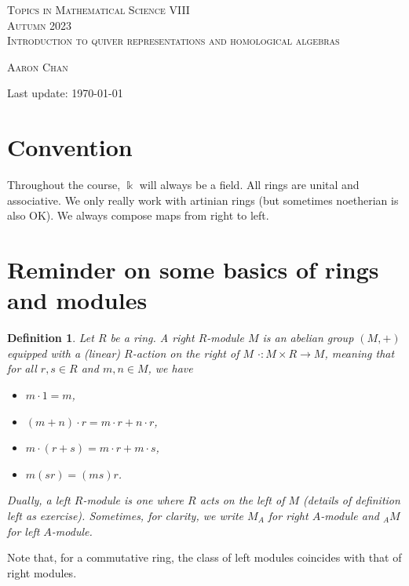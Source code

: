 \documentclass[11pt,a4paper]{article}
\numberwithin{equation}{section}
\theoremstyle{all}
\newtheorem{definition}[theorem]{Definition}
\theoremstyle{remark}
\newcommand{\defn}[1]{\textsl{\color{darkblue} #1}}
\begin{document}
\begin{center}
\textsc{{\LARGE Topics in Mathematical Science VIII}\\
Autumn 2023}\\
\textsc{\Large Introduction to quiver representations and homological algebras}

\textsc{Aaron Chan}
\end{center}

Last update: \today



\section*{Convention}
 
Throughout the course, $\Bbbk$ will always be a field.
All rings are unital and associative.
We only really work with artinian rings (but sometimes noetherian is also OK).
We always compose maps from right to left.

\section{Reminder on some basics of rings and modules}

\begin{definition}
Let $R$ be a ring.
A \defn{right $R$-module} $M$ is an abelian group $(M,+)$ equipped with a (linear) \defn{$R$-action on the right of $M$} $\cdot:M\times R\to M$, meaning that for all $r,s\in R$ and $m,n\in M$, we have
\begin{itemize}
\item $m\cdot 1 = m$,
\item $(m+n)\cdot r=m\cdot r+n\cdot r$,
\item $m\cdot (r+s)=m\cdot r+m\cdot s$,
\item $m(sr)=(ms)r$.
\end{itemize}
Dually, a \defn{left $R$-module} is one where $R$ acts on the left of $M$ (details of definition left as exercise).
Sometimes, for clarity, we write $M_A$ for right $A$-module and ${}_AM$ for left $A$-module.
\end{definition}
Note that, for a commutative ring, the class of left modules coincides with that of right modules.
\end{document}

